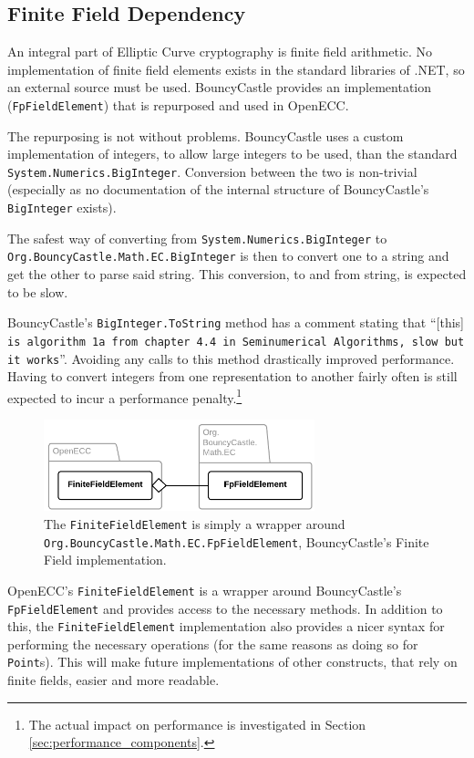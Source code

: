 \subsection{Finite Field Dependency}
\label{sec:implementation__dependencies}
\label{sec:implementation_dependency}

An integral part of Elliptic Curve cryptography is finite field arithmetic. No implementation of finite field elements exists
in the standard libraries of .NET, so an external source must be used. BouncyCastle provides an implementation (\texttt{FpFieldElement})
that is repurposed and used in OpenECC.

The repurposing is not without problems. BouncyCastle uses a custom implementation of integers, to allow large integers to
be used, than the standard \texttt{System.Numerics.BigInteger}. Conversion between the two is non-trivial (especially as no documentation
of the internal structure of BouncyCastle's \texttt{BigInteger} exists).

The safest way of converting from \texttt{System.Numerics.BigInteger} to \\
\texttt{Org.BouncyCastle.Math.EC.BigInteger} is then to convert one to a string and get the other to parse said string. This conversion,
to and from string, is expected to be slow.

BouncyCastle's \verb+BigInteger.ToString+ method has a comment stating that ``[this] \texttt{is algorithm 1a from chapter 4.4 in Seminumerical
Algorithms, slow but it works}''. Avoiding any calls to this method drastically improved performance. Having to convert integers from one
representation to another fairly often is still expected to incur a performance penalty.\footnote{The actual impact on performance is investigated
in Section \ref{sec:performance_components}.}

\begin{figure}[htb]
	\centering
	\includegraphics[width=0.7\textwidth]{implementation/finitefields}
	\caption{The \texttt{FiniteFieldElement} is simply a wrapper around \texttt{Org.BouncyCastle.Math.EC.FpFieldElement},
		BouncyCastle's Finite Field implementation.}
\end{figure}

OpenECC's \texttt{FiniteFieldElement} is a wrapper around BouncyCastle's \\
\verb+FpFieldElement+ and provides access to the necessary methods.
In addition to this, the \texttt{FiniteFieldElement} implementation also provides a nicer syntax for performing the necessary operations
(for the same reasons as doing so for \texttt{Point}s). This will make future implementations of other constructs, that rely on finite fields,
easier and more readable.